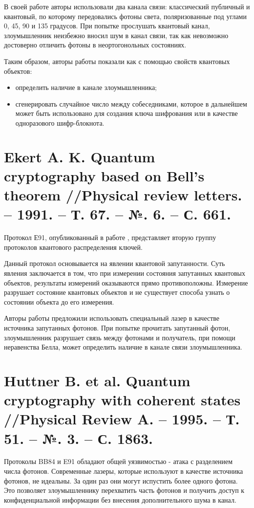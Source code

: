 В своей работе авторы использовали два канала связи: классический публичный и квантовый, по которому передовались фотоны света, поляризованные под углами 0, 45, 90 и 135 градусов. При попытке прослушать квантовый канал, злоумышленник неизбежно вносил шум в канал связи, так как невозможно достоверно отличить фотоны в неортогонольных состояниях.

Таким образом, авторы работы показали как с помощью свойств квантовых объектов:
\begin{itemize}
	\item определить наличие в канале злоумышленника;
	\item сгенерировать случайное число между собеседниками, которое в дальнейшем может быть использовано для создания ключа шифрования или в качестве одноразового шифр-блокнота.
\end{itemize}

\section{Ekert A. K. Quantum cryptography based on Bell’s theorem //Physical review letters. – 1991. – Т. 67. – №. 6. – С. 661.}
Протокол Е91, опубликованный в работе \cite{ekert1991quantum}, представляет вторую группу протоколов квантового распределения ключей.

Данный протокол основывается на явлении квантовой запутанности. Суть явления заключается в том, что при измерении состояния запутанных квантовых объектов, результаты измерений оказываются прямо противоположны. Измерение разрушает состояние квантовых объектов и не существует способа узнать о состоянии объекта до его измерения.

Авторы работы предложили использовать специальный лазер в качестве источника запутанных фотонов. При попытке прочитать запутанный фотон, злоумышленник разрушает связь между фотонами и получатель, при помощи неравенства Белла, может определить наличие в канале связи злоумышленника.


\section{Huttner B. et al. Quantum cryptography with coherent states //Physical Review A. – 1995. – Т. 51. – №. 3. – С. 1863.}
Протоколы BB84 и E91 обладают общей уязвимостью - атака с разделением числа фотонов. Современные лазеры, которые используют в качестве источника фотонов, не идеальны. За один раз они могут испустить более одного фотона. Это позволяет злоумышленнику перехватить часть фотонов и получить доступ к конфиденциальной информации без внесения дополнительного шума в канал.

